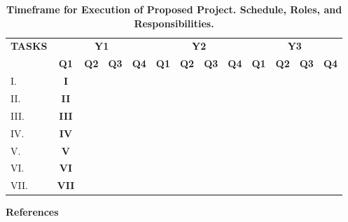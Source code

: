 \documentclass[11pt,letterpaper]{article}
\newcommand{\x}{\cellcolor{lightgray}} %
\begin{document}
\begin{table}[h!]
    \centering
    \caption*{\textbf{Timeframe for Execution of Proposed Project. Schedule, Roles, and Responsibilities.}}
    \begin{tabular}{|l|c|c|c|c|c|c|c|c|c|c|c|c|}
        \hline
        \multicolumn{1}{|c|}{\multirow{2}{*}{\textbf{TASKS}}}& 
        \multicolumn{4}{|c|}{\textbf{Y1}}&
        \multicolumn{4}{|c|}{\textbf{Y2}}&
        \multicolumn{4}{|c|}{\textbf{Y3}}\\
        \cline{2-13}
        &
        \textbf{Q1}& 
        \textbf{Q2}& 
        \textbf{Q3}& 
        \textbf{Q4}& 
        \textbf{Q1}& 
        \textbf{Q2}& 
        \textbf{Q3}& 
        \textbf{Q4}& 
        \textbf{Q1}& 
        \textbf{Q2}& 
        \textbf{Q3}& 
        \textbf{Q4}\\
        \hline
        I. 
        &\x\textbf{I}
        & 
        & 
        & 
        & 
        & 
        & 
        & 
        & 
        & 
        & 
        & \\
        \hline
        II. 
        &\x\textbf{II} 
        & 
        & 
        & 
        & 
        & 
        & 
        & 
        & 
        & 
        & 
        & \\
        \hline
        III. 
        &\x\textbf{III} 
        & 
        & 
        & 
        & 
        & 
        & 
        & 
        & 
        & 
        & 
        & \\
        \hline
        IV. 
        &\x\textbf{IV}
        & 
        & 
        & 
        & 
        & 
        & 
        & 
        & 
        & 
        & 
        & \\
        \hline
        V. 
        &\x\textbf{V} 
        & 
        & 
        & 
        & 
        & 
        & 
        & 
        & 
        & 
        & 
        & \\
        \hline
        VI. 
        &\x\textbf{VI} 
        & 
        & 
        & 
        & 
        & 
        & 
        & 
        & 
        & 
        & 
        & \\
        \hline
        VII. 
        &\x\textbf{VII} 
        & 
        & 
        & 
        & 
        & 
        & 
        & 
        & 
        & 
        & 
        & \\
        \hline
    \end{tabular}
    \label{tab-timeframe}
\end{table}

\noindent\textbf{References}

\setlength{\bibhang}{0pt}


\end{document}

